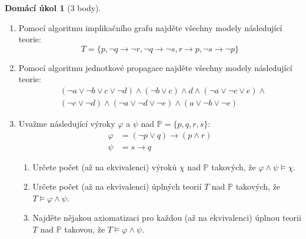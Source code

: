 \documentclass[a4paper]{article}
\theoremstyle{definition}
\newtheorem*{ukol}{Domácí úkol}
\begin{document}
\medskip\begin{ukol}[3 body]{\,}
\begin{enumerate}[label=\arabic*.]
\item Pomocí algoritmu implikačního grafu najděte všechny modely následující teorie:
$$
T=\{p,\neg q \to \neg r,\neg q \to \neg s,r \to p,\neg s \to \neg p\}
$$

\item Pomocí algoritmu jednotkové propagace najděte všechny modely následující teorie:
\begin{align*}
    &(\neg a \vee \neg b \vee c \vee \neg d)\wedge(\neg b \vee c)\wedge d \wedge (\neg a \vee \neg c \vee e)\wedge \\
    &(\neg c \vee \neg d)\wedge(\neg a \vee \neg d \vee \neg e)\wedge(a\vee \neg b \vee\neg e)
\end{align*}

\item Uvažme následující výroky $\varphi$ a $\psi$ nad $\mathbb P=\{p, q, r, s\}$:
\begin{align*}
    \varphi &= (\neg p \vee  q)\to(p\wedge r)\\
    \psi &= s\to q
\end{align*}
\begin{enumerate}
    \item Určete počet (až na ekvivalenci) výroků $\chi$ nad $\mathbb P$ takových, že $\varphi\wedge\psi\models\chi$.
    \item Určete počet (až na ekvivalenci) úplných teorií $T$ nad $\mathbb P$ takových, že $T\models\varphi\wedge\psi$.
    \item Najděte nějakou axiomatizaci pro každou (až na ekvivalenci) úplnou teorii $T$ nad $\mathbb P$ takovou, že $T\models\varphi\wedge\psi$.
\end{enumerate}
\end{enumerate} 
\end{ukol}
\end{document}
